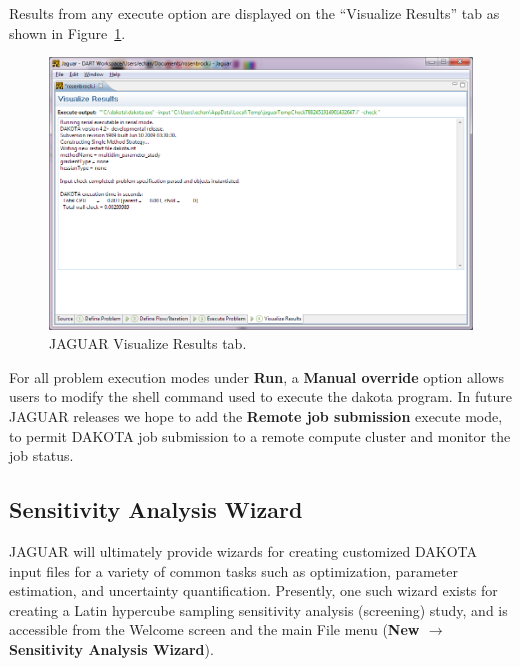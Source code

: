 Results from any execute option are displayed on the ``Visualize
Results'' tab as shown in Figure~\ref{fig:input:jaguar_visualize}.

\begin{figure}[htbp]
  \centering
  \includegraphics[scale=0.6]{images/5Visualize}
  \caption{JAGUAR Visualize Results tab.}
  \label{fig:input:jaguar_visualize}
\end{figure}

For all problem execution modes under {\bf Run}, a {\bf Manual
  override} option allows users to modify the shell command used to
execute the dakota program.  In future JAGUAR releases we hope to add
the {\bf Remote job submission} execute mode, to permit DAKOTA job
submission to a remote compute cluster and monitor the job status.


\subsection{Sensitivity Analysis Wizard}

JAGUAR will ultimately provide wizards for creating customized DAKOTA
input files for a variety of common tasks such as optimization,
parameter estimation, and uncertainty quantification.  Presently, one
such wizard exists for creating a Latin hypercube sampling sensitivity
analysis (screening) study, and is accessible from the Welcome screen
and the main File menu ({\bf New $\rightarrow$ Sensitivity Analysis
Wizard}).

